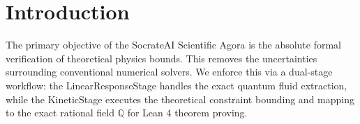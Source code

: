 \documentclass[11pt,a4paper]{article}
\begin{document}
\begin{abstract}
This report documents the formalized mathematical physics protocols executed within the SocrateAI Scientific Agora. Strict adherence to the ``Z\'ero Simulation Flottante'' policy is maintained throughout: all continuous physical phenomena, including Landau Damping, non-linear Quantum Volterra echoes, and Roton scattering kernels, are extracted algebraically over the rational field $\mathbb{Q}$ avoiding any floating-point hallucinations. The resulting exact sequences are subsequently checked by the Lean 4 kernel utilizing the Mathlib \texttt{Rat} type, which certifies the exact rational arithmetic performed on those sequences (see the note above and \texttt{RETRACTIONS.md} for what this does and does not establish about the physics). This multi-stage pipeline orchestrates symbolic computation across specialized processing layers to achieve formal verification of that arithmetic.
\end{abstract}

\section{Introduction}
The primary objective of the SocrateAI Scientific Agora is the absolute formal verification of theoretical physics bounds. This removes the uncertainties surrounding conventional numerical solvers. We enforce this via a dual-stage workflow: the LinearResponseStage handles the exact quantum fluid extraction, while the KineticStage executes the theoretical constraint bounding and mapping to the exact rational field $\mathbb{Q}$ for Lean 4 theorem proving.
\end{document}
